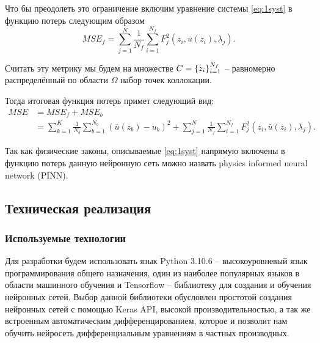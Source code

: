 \documentclass[a4paper,14pt]{extarticle} %
\begin{document}
Что бы преодолеть это ограничение включим уравнение системы \ref{eq:1syst} в функцию потерь следующим образом
\begin{equation}
    MSE_f = \sum_{j=1}^N\frac{1}{N_f}\sum_{i=1}^{N_f} F_j^2(z_i, \bar{u}(z_i), \lambda_j).
\end{equation}

Считать эту метрику мы будем на множестве $C = {\left\{ z_i \right\}}_{i=1}^{N_f}$ -- равномерно распределённый по области $\Omega$ набор точек коллокации.

Тогда итоговая функция потерь примет следующий вид:
\begin{equation} \label{eq:pinn_loss}
    \begin{aligned}
        MSE & = MSE_f + MSE_b                                                                                                                                        \\
            & =  \sum_{k=1}^{K}\frac{1}{N_b}\sum_{b=1}^{N_b} (\bar{u}(z_b) - u_b)^2 + \sum_{j=1}^N\frac{1}{N_f}\sum_{i=1}^{N_f} F_j^2(z_i, \bar{u}(z_i), \lambda_j).
    \end{aligned}
\end{equation}

Так как физические законы, описываемые \eqref{eq:1syst} напрямую включены в функцию потерь данную нейронную сеть можно назвать physics informed neural network (PINN).


\FloatBarrier
\subsection{Техническая реализация}
\subsubsection{Используемые технологии}


Для разработки будем использовать язык Python 3.10.6 -- высокоуровневый язык программирования общего назначения, один из наиболее популярных языков в области машинного обучения и Tensorflow -- библиотеку для создания и обучения нейронных сетей. Выбор данной библиотеки обусловлен простотой создания нейронных сетей с помощью Keras API, высокой производительностью, а так же встроенным автоматическим дифференцированием, которое и позволит нам обучить нейросеть дифференциальным уравнениям в частных производных.
\end{document}

